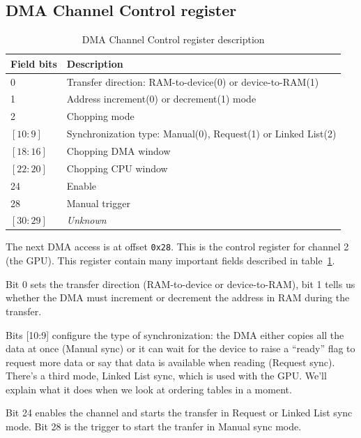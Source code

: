 \documentclass[a4paper]{article}
\newcommand{\code}[1] {\texttt{#1}}
\begin{document}
\subsection{DMA Channel Control register}

\begin{table}[ht]
  \centering

  \begin{tabular}{ l | l }
    Field bits & Description \\
    \hline
    0         & Transfer direction: RAM-to-device(0) or device-to-RAM(1) \\
    1         & Address increment(0) or decrement(1) mode \\
    2         & Chopping mode \\
    $[10:9]$  & Synchronization type: Manual(0), Request(1)
                or Linked List(2) \\
    $[18:16]$ & Chopping DMA window \\
    $[22:20]$ & Chopping CPU window \\
    24        & Enable \\
    28        & Manual trigger \\
    $[30:29]$ & \emph{Unknown} \\
  \end{tabular}

  \caption{DMA Channel Control register description}
  \label{tab:dma_channel_control}
\end{table}

The next DMA access is at offset \code{0x28}. This is the control
register for channel 2 (the GPU). This register contain many
important fields described in table~\ref{tab:dma_channel_control}.

Bit 0 sets the transfer direction (RAM-to-device or device-to-RAM),
bit 1 tells us whether the DMA must increment or decrement the address
in RAM during the transfer.

Bits [10:9] configure the type of synchronization: the DMA either
copies all the data at once (Manual sync) or it can wait for the
device to raise a ``ready'' flag to request more data or say that data
is available when reading (Request sync). There's a third mode, Linked
List sync, which is used with the GPU. We'll explain what it does when
we look at ordering tables in a moment.

Bit 24 enables the channel and starts the transfer in Request or
Linked List sync mode. Bit 28 is the trigger to start the tranfer in
Manual sync mode.
\end{document}
